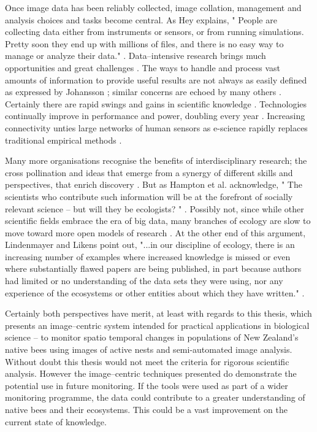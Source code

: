 Once image data has been reliably collected, image collation, management and analysis choices and tasks become central. As Hey \cite{Hey2009} explains, " People are collecting data either from instruments or sensors, or from running simulations. Pretty soon they end up with millions of files, and there is no easy way to manage or analyze their data." \cite{Hey2009}. Data--intensive research brings much opportunities and great challenges \cite{Kelling2009, Goodchild2010}. The ways to handle and process vast amounts of information to provide useful results are not always as easily defined as expressed by Johansson \cite{Johansson2011}; similar concerns are echoed by many others \cite{Kelling2009, Hey2009, Lindenmayer2013}. Certainly there are rapid swings and gains in scientific knowledge \cite{Sanchez2011}. Technologies continually improve in performance and power, doubling every year \cite{Mack2015}. Increasing connectivity unties large networks of human sensors \cite{Goodchild2007} as e-science rapidly replaces traditional empirical methods \cite{Hey2009, Bell2009}.

Many more organisations recognise the benefits of interdisciplinary research\label{socially relevant science}; the cross pollination and ideas that emerge from a synergy of different skills and perspectives, that enrich discovery \cite{Kaku1999}. But as Hampton et al.\cite{Hampton2013} acknowledge, " The scientists who contribute such information will be at the forefront of socially relevant science -- but will they be ecologists? " \cite[pg. 156]{Hampton2013}. Possibly not, since while other scientific fields embrace the era of big data, many branches of ecology are slow to move toward more open models of research \cite{Hampton2013}. At the other end of this argument, Lindenmayer and Likens\cite{Lindenmayer2013} point out, "...in our discipline of ecology, there is an increasing number of examples where increased knowledge is missed or even where substantially flawed papers are being published, in part because authors had limited or no understanding of the data sets they were using, nor any experience of the ecosystems or other entities about which they have written." \cite[pg. 338]{Lindenmayer2013}. 

Certainly both perspectives have merit, at least with regards to this thesis, which presents an image--centric system intended for practical applications in biological science -- to monitor spatio temporal changes in populations of New Zealand's native bees using images of active nests and semi-automated image analysis. Without doubt this thesis would not meet the criteria for rigorous scientific analysis.  However the image--centric techniques presented do demonstrate the potential use in future monitoring. If the tools were used as part of a wider monitoring programme, the data could contribute to a greater understanding of native bees and their ecosystems. This could be a vast improvement on the current state of knowledge.

